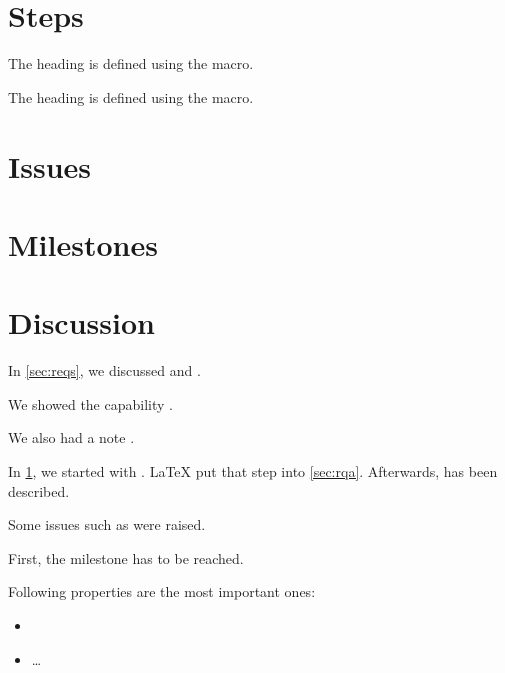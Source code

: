 \documentclass[parskip=full]{scrartcl}
\begin{document}
\section{Steps}
\label{sec:steps}

\label{sec:rqa}
The heading is defined using the macro.

The heading is defined using the macro.


\section{Issues}



\section{Milestones}
\label{sec:milestones}


\section{Discussion}
\label{sec:discussion}
In \cref{sec:reqs}, we discussed  and .

We showed the capability .

We also had a note .

In \cref{sec:steps}, we started with .
\LaTeX{} put that step into \cref{sec:rqa}.
Afterwards,  has been described.

Some issues such as  were raised.

First, the milestone  has to be reached.

Following properties are the most important ones:
\begin{itemize}
\item {}
\item \ldots
\end{itemize}
\end{document}
